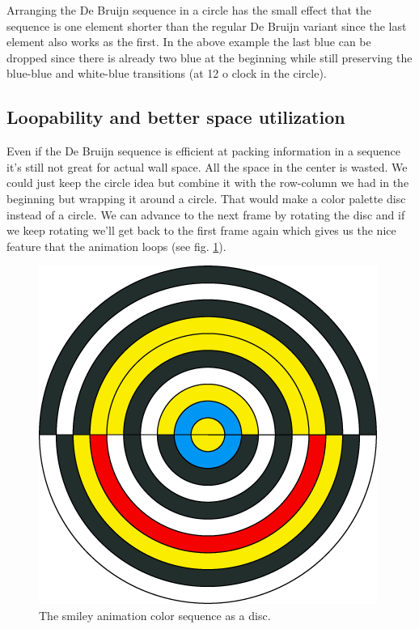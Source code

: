 \documentclass{article}
\begin{document}
Arranging the De Bruijn sequence in a circle has the small effect that
the sequence is one element shorter than the regular De Bruijn variant
since the last element also works as the first. In the above example the
last blue can be dropped since there is already two blue at the
beginning while still preserving the blue-blue and white-blue
transitions (at 12 o clock in the circle).


\subsection{Loopability and better space utilization}

Even if the De Bruijn sequence is efficient at packing information in a
sequence it's still not great for actual wall space. All the space in
the center is wasted. We could just keep the circle idea but combine it
with the row-column we had in the beginning but wrapping it around a
circle. That would make a color palette disc instead of a circle. We
can advance to the next frame by rotating the disc and if we keep
rotating we'll get back to the first frame again which gives us the nice
feature that the animation loops (see fig. \ref{fig:sequence_wheel_non_sorted}).

\begin{figure}[ht!]
\centering
\includegraphics{images/sequence-wheel-non-sorted.png}
\caption{The smiley animation color sequence as a disc.}
\label{fig:sequence_wheel_non_sorted}
\end{figure}
\end{document}
